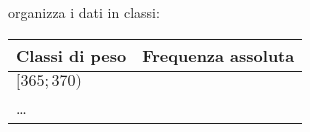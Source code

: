 \begin{esercizio}
\begin{enumeratea}

\item organizza i dati in classi:
\begin{center}
\begin{tabular}{lc}
\toprule
Classi di peso & Frequenza assoluta\\
\midrule
\([365; 370)\) & \\
\ldots & \\
\bottomrule
\end{tabular}
\end{center}
\end{enumeratea}
\end{esercizio}

